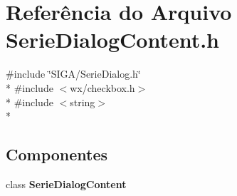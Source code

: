 \section{Referência do Arquivo Serie\+Dialog\+Content.\+h}
\label{_serie_dialog_content_8h}
{\ttfamily \#include \char`\"{}S\+I\+G\+A/\+Serie\+Dialog.\+h\char`\"{}}\\*
{\ttfamily \#include $<$wx/checkbox.\+h$>$}\\*
{\ttfamily \#include $<$string$>$}\\*
\subsection*{Componentes}
\begin{DoxyCompactItemize}
\item 
class {\bf Serie\+Dialog\+Content}
\end{DoxyCompactItemize}
